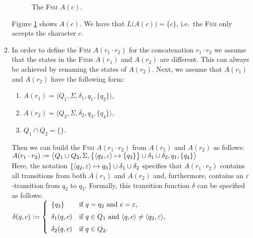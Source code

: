 \begin{enumerate}
      \begin{figure}[!ht]
        \centering
      \caption{The \textsc{Fsm} $A(c)$.}
      \label{fig:aChar.eps}
      \end{figure}
      Figure \ref{fig:aChar.eps} shows $A(c)$.
      We have that $L\bigl(A(c)\bigr) = \{c\}$, i.e.~the \textsc{Fsm} only accepts the character $c$. 
\item In order to define the \textsc{Fsm} $A(r_1 \cdot r_2)$ for the concatenation $r_1 \cdot r_2$ 
      we assume that the states in the \textsc{Fsm}s  $A(r_1)$ and $A(r_2)$ are different. 
      This can always be achieved by renaming the states of $A(r_2)$.
      Next, we assume that $A(r_1)$ and $A(r_2)$ have the following form:
      \begin{enumerate}
      \item $A(r_1) = \bigl\langle Q_1, \Sigma, \delta_1, q_1, \{ q_2 \}\bigr\rangle$,
      \item $A(r_2) = \bigl\langle Q_2, \Sigma, \delta_2, q_3, \{ q_4 \}\bigr\rangle$,
      \item $Q_1 \cap Q_2 = \{\}$.
      \end{enumerate}
      Then we can build the \textsc{Fsm} $A(r_1 \cdot r_2)$ from $A(r_1)$ and $A(r_2)$ as follows:
      \\[0.2cm]
      \hspace*{0.8cm}
       $A(r_1 \cdot r_2) := \bigl\langle Q_1 \cup Q_2, \Sigma, 
                \bigl\{ \pair(q_2,\varepsilon) \mapsto \{q_3\} \bigr\} 
                   \cup \delta_1 \cup \delta_2, q_1, \{ q_4 \} \bigr\rangle$
      \\[0.2cm]
      Here, the notation $\{ \pair(q_2,\varepsilon) \mapsto q_3 \} \cup \delta_1 \cup \delta_2$ specifies that
      $A(r_1 \cdot r_2)$ contains all transitions from both $A(r_1)$ and $A(r_2)$ and, furthermore,
      contains an $\varepsilon$-transition from $q_2$ to $q_3$.     
      Formally, this transition function  $\delta$ can be specified as follows:
      \\[0.2cm]
      \hspace*{1.3cm}
      $\delta(q,c) := \left\{
      \begin{array}{ll}
        \{ q_3 \}       & \mbox{if $q = q_2$ and $c = \varepsilon$}, \\[0.2cm]
        \delta_1(q, c)  & \mbox{if $q \in Q_1$ and $\pair(q,c) \not= \pair(q_2,\varepsilon)$}, \\[0.2cm]
        \delta_2(q, c)  & \mbox{if $q \in Q_2$.} 
      \end{array}\right.
      $
      \\[0.2cm]



\end{enumerate}
